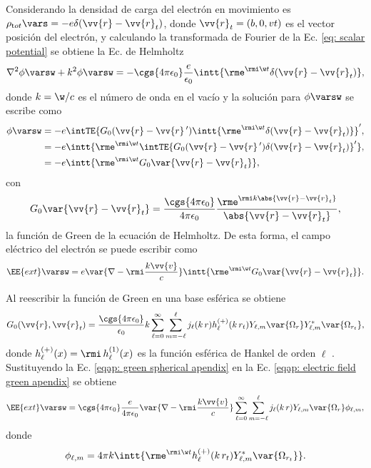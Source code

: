 Considerando la densidad de carga del electrón en movimiento es $\rho_{\text tot}\vars = -e \delta(\vv{r}-\vv{r}_t)$, donde $\vv{r}_t = (b,0,vt)$ es el vector posición del electrón, y calculando la transformada de Fourier de la Ec. \eqref{eq: scalar potential} se obtiene la Ec. de Helmholtz
\begin{equation}
\nabla^2\phi\varsw + k^2\phi\varsw = -\cgs{4\pi\epsilon_0}\frac{e}{\epsilon_0}\intt{\rme^{\rmi \w t} \delta(\vv{r}-\vv{r}_t)},
\end{equation}
donde $k = \w/c$ es el número de onda en el vacío y la solución para $\phi\varsw$ se escribe como \cite{maciel2019electromagnetic, de1999relativistic, barton1989elements} 
\begin{align}
\phi\varsw &= -e\intTE{G_0(\vv{r}-\vv{r}\,^{\prime})\intt{\rme^{\rmi \w t}\delta(\vv{r}-\vv{r}_t)}}^{\prime},\\
		   &= -e\intt{\rme^{\rmi \w t} \intTE{ G_0(\vv{r}-\vv{r}\,^{\prime}) \delta(\vv{r}-\vv{r}_t)}^{\prime}},\\
		   &= -e\intt{\rme^{\rmi \w t}G_0\var{\vv{r}-\vv{r}_t}},
\end{align}
con 
\begin{equation}
G_0\var{\vv{r}-\vv{r}_t} = \frac{\cgs{4\pi\epsilon_0}}{4\pi\epsilon_0}\frac{\rme^{\rmi k \abs{\vv{r}-\vv{r}_t}}}{\abs{\vv{r}-\vv{r}_t}},
\end{equation}
la función de Green de la ecuación de Helmholtz. De esta forma, el campo eléctrico del electrón se puede escribir como
\begin{equation}
\EE{ext}\varsw = e\var{\nabla-\rmi \frac{k\vv{v}}{c}} \intt{\rme^{\rmi \w t} G_0 \var{\vv{r}-\vv{r}_t}}. 
\label{eqap: electric field green apendix}
\end{equation}

Al reescribir la función de Green en una base esférica se obtiene \cite{de1999relativistic}
\begin{equation}
G_0(\vv{r},\vv{r}_t)=\frac{\cgs{4\pi\epsilon_0}}{\epsilon_0} k \sum_{\ell=0}^{\infty}\sum_{m=-\ell}^{\ell} j_{\ell}(k \, r) h_{\ell}^{(+)}(k \, r_t) Y_{\ell,m}\var{\Omega_r} Y_{\ell, m}^{*}\var{\Omega_{r_t}}, \label{eqap: green spherical apendix}
\end{equation}
donde $h_{\ell}^{(+)}(x)= \rmi \, h_{\ell}^{(1)}(x)$ es la función esférica de Hankel de orden $\ell$ \cite{Abramowitz}. Sustituyendo la Ec. \eqref{eqap: green spherical apendix} en la Ec. \eqref{eqap: electric field green apendix} se obtiene
\begin{equation}
\EE{ext}\varsw = \cgs{4\pi\epsilon_0}\frac{e}{4\pi\epsilon_0}\var{\nabla-\rmi \frac{k\vv{v}}{c}} \sum_{\ell=0}^{\infty}\sum_{m=-\ell}^{\ell} j_{\ell}(k \, r) Y_{\ell,m}\var{\Omega_r} \phi_{\ell, m},
\label{eqap: ext electric field spherical}
\end{equation}
donde 
\begin{equation}
\phi_{\ell, m} = 4\pi k \intt{\rme^{\rmi \w t} h_{\ell}^{(+)}(k \, r_t) Y_{\ell, m}^{*}\var{\Omega_{r_t}}}.
\label{eqap: phi lm apendix}
\end{equation}

